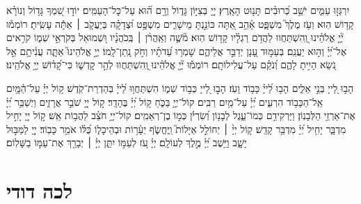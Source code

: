 {
יִרְגְּז֣וּ עַמִּ֑ים יֹשֵׁ֥ב כְּ֝רוּבִ֗ים תָּנ֥וּט הָאָֽרֶץ׃
יְיָ֭ בְּצִיּ֣וֹן גָּד֑וֹל וְרָ֥ם ה֗֝וּא עַל־כׇּל־הָעַמִּֽים׃
יוֹד֣וּ שִׁ֭מְךָ גָּד֥וֹל וְנוֹרָ֗א קָד֥וֹשׁ הֽוּא׃
וְעֹ֥ז מֶלֶךְ֮ מִשְׁפָּ֢ט אָ֫הֵ֥ב אַ֭תָּה כּוֹנַ֣נְתָּ מֵישָׁרִ֑ים מִשְׁפָּ֥ט וּ֝צְדָקָ֗ה בְּיַעֲקֹ֤ב ׀ אַתָּ֬ה עָשִֽׂיתָ׃
רוֹמְמ֡וּ יְ֘יָ֤ אֱלֹהֵ֗ינוּ וְֽ֭הִשְׁתַּחֲווּ לַהֲדֹ֥ם רַגְלָ֗יו קָד֥וֹשׁ הֽוּא׃
מֹ֘שֶׁ֤ה וְאַֽהֲרֹ֨ן ׀ בְּֽכֹהֲנָ֗יו וּ֭שְׁמוּאֵל בְּקֹרְאֵ֣י שְׁמ֑וֹ קֹרִ֥אים אֶל־יְ֝יָ֗ וְה֣וּא יַעֲנֵֽם׃
בְּעַמּ֣וּד עָ֭נָן יְדַבֵּ֣ר אֲלֵיהֶ֑ם שָׁמְר֥וּ עֵ֝דֹתָ֗יו וְחֹ֣ק נָֽתַן־לָֽמוֹ׃
יְיָ֣ אֱלֹהֵינוּ֮ אַתָּ֢ה עֲנִ֫יתָ֥ם אֵ֣ל נֹ֭שֵׂא הָיִ֣יתָ לָהֶ֑ם וְ֝נֹקֵ֗ם עַל־עֲלִילוֹתָֽם׃
רוֹמְמ֡וּ יְ֘יָ֤ אֱלֹהֵ֗ינוּ וְֽ֭הִשְׁתַּחֲווּ לְהַ֣ר קׇדְשׁ֑וֹ כִּי־קָ֝ד֗וֹשׁ יְיָ֥ אֱלֹהֵֽינוּ׃

הָב֣וּ לַ֭ייָ בְּנֵ֣י אֵלִ֑ים הָב֥וּ לַ֝ייָ֗ כָּב֥וֹד וָעֹֽז׃
הָב֣וּ לַ֭ייָ כְּב֣וֹד שְׁמ֑וֹ הִשְׁתַּחֲו֥וּ לַ֝ייָ֗ בְּהַדְרַת־קֹֽדֶשׁ׃
ק֥וֹל יְיָ֗ עַל־הַ֫מָּ֥יִם אֵֽל־הַכָּב֥וֹד הִרְעִ֑ים יְ֝יָ֗ עַל־מַ֥יִם רַבִּֽים׃
קוֹל־יְיָ֥ בַּכֹּ֑חַ ק֥וֹל יְ֝יָ֗ בֶּהָדָֽר׃
ק֣וֹל יְיָ֭ שֹׁבֵ֣ר אֲרָזִ֑ים וַיְשַׁבֵּ֥ר יְ֝יָ֗ אֶת־אַרְזֵ֥י הַלְּבָנֽוֹן׃
וַיַּרְקִידֵ֥ם כְּמוֹ־עֵ֑גֶל לְבָנ֥וֹן וְ֝שִׂרְיֹ֗ן כְּמ֣וֹ בֶן־רְאֵמִֽים׃
קוֹל־יְיָ֥ חֹצֵ֗ב לַהֲב֥וֹת אֵֽשׁ׃
ק֣וֹל יְיָ֭ יָחִ֣יל מִדְבָּ֑ר יָחִ֥יל יְ֝יָ֗ מִדְבַּ֥ר קָדֵֽשׁ׃
ק֤וֹל יְיָ֨ ׀ יְחוֹלֵ֣ל אַיָּלוֹת֮ וַֽיֶּחֱשֹׂ֢ף יְעָ֫ר֥וֹת וּבְהֵיכָל֑וֹ כֻּ֝לּ֗וֹ אֹמֵ֥ר כָּבֽוֹד׃
יְיָ֭ לַמַּבּ֣וּל יָשָׁ֑ב וַיֵּ֥שֶׁב יְ֝יָ֗ מֶ֣לֶךְ לְעוֹלָֽם׃
יְיָ֗ עֹ֭ז לְעַמּ֣וֹ יִתֵּ֑ן יְיָ֓ ׀ יְבָרֵ֖ךְ אֶת־עַמּ֣וֹ בַשָּׁלֽוֹם׃


\section[לכה דודי]{ לכה דודי }

\newcommand{\lechadodi}{\textbf{לְכָה דוֹדִי לִקְרַאת כַּלָּה פְּנֵי שַׁבָּת נְקַבְּלָה׃}\\}

\newcommand{\lechadodiverse}[4]{
#1 \hfill #2\\
#3 \hfill #4\\
}

}
